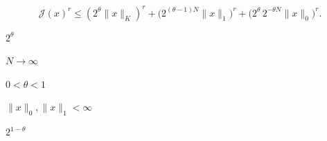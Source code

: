 \documentclass{article}
\begin{document}
\begin{preview}
\setcounter{equation}{0}%
\[\mathcal{J}(x)^r \le (2^\theta\|x\|_K)^r + \bigl(2^{(\theta-1)N}\|x\|_1\bigr)^r
  + \bigl(2^\theta\,2^{-\theta N}\|x\|_0\bigr)^r.\]
\end{preview}

\begin{preview}
\setcounter{equation}{0}%
\(2^\theta\)
\end{preview}

\begin{preview}
\setcounter{equation}{0}%
\(N → ∞\)
\end{preview}

\begin{preview}
\setcounter{equation}{0}%
\(0 < θ < 1\)
\end{preview}

\begin{preview}
\setcounter{equation}{0}%
\(\|x\|_0, \|x\|_1 < ∞\)
\end{preview}

\begin{preview}
\setcounter{equation}{0}%
\(2^{1-\theta}\)
\end{preview}
\end{document}
